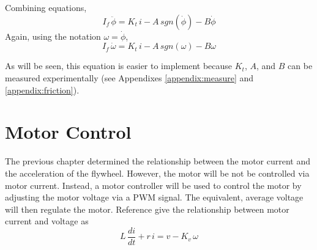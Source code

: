 \documentclass[12pt,letterpaper]{article}
\begin{document}

Combining equations,
%
\begin{equation}
    I_{f} \, \ddot{\phi}  = K_{t} \, i - A \, sgn(\dot{\phi} ) - B \dot{\phi}
\end{equation}
%
Again, using the notation $\omega = \dot{\phi}$,
%
\begin{equation}
    I_{f} \, \dot{\omega}  = K_{t} \, i - A \, sgn(\omega) - B \omega \label{wheel}
\end{equation}
%

As will be seen, this equation is easier to implement because $K_{t}$, $A$, and $B$ can be measured experimentally (see Appendixes \ref{appendix:measure} and \ref{appendix:friction}).  







\section{Motor Control}
The previous chapter determined the relationship between the motor current and the acceleration of the flywheel.  
However, the motor will be not be controlled via motor current.  Instead, a motor controller will be used to control the 
motor by adjusting the motor voltage via a PWM signal.  The equivalent, average voltage will then regulate the motor.  
Reference \cite{monograph} give the relationship between motor current and voltage as
%
\begin{equation}
    L\, \frac{di}{dt} + r \,i = v - K_{v} \, \omega
\end{equation}
%

\end{document}
